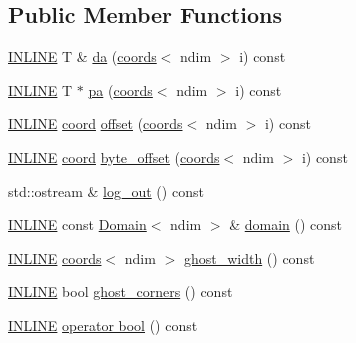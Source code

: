 \subsection*{Public Member Functions}
\begin{DoxyCompactItemize}
\item 
\hyperlink{common_8hpp_a2eb6f9e0395b47b8d5e3eeae4fe0c116}{I\+N\+L\+I\+NE} T \& \hyperlink{classshark_1_1ndim_1_1_global_array_aeadb9a62b97953c4b7a7a047632d117a}{da} (\hyperlink{structshark_1_1ndim_1_1coords}{coords}$<$ ndim $>$ i) const
\item 
\hyperlink{common_8hpp_a2eb6f9e0395b47b8d5e3eeae4fe0c116}{I\+N\+L\+I\+NE} T $\ast$ \hyperlink{classshark_1_1ndim_1_1_global_array_a31a8a5247cc8adbe0602a83de759d915}{pa} (\hyperlink{structshark_1_1ndim_1_1coords}{coords}$<$ ndim $>$ i) const
\item 
\hyperlink{common_8hpp_a2eb6f9e0395b47b8d5e3eeae4fe0c116}{I\+N\+L\+I\+NE} \hyperlink{namespaceshark_a767a92d5dd82cb82266473bff42fa6d9}{coord} \hyperlink{classshark_1_1ndim_1_1_global_array_a63c8f10949e3f8d7ffdf532440190ca1}{offset} (\hyperlink{structshark_1_1ndim_1_1coords}{coords}$<$ ndim $>$ i) const
\item 
\hyperlink{common_8hpp_a2eb6f9e0395b47b8d5e3eeae4fe0c116}{I\+N\+L\+I\+NE} \hyperlink{namespaceshark_a767a92d5dd82cb82266473bff42fa6d9}{coord} \hyperlink{classshark_1_1ndim_1_1_global_array_afc41f124baff4e53c97c38c8cbd82398}{byte\+\_\+offset} (\hyperlink{structshark_1_1ndim_1_1coords}{coords}$<$ ndim $>$ i) const
\item 
std\+::ostream \& \hyperlink{classshark_1_1ndim_1_1_global_array_ae56b93f4ac19003102749015275a6d0c}{log\+\_\+out} () const
\item 
\hyperlink{common_8hpp_a2eb6f9e0395b47b8d5e3eeae4fe0c116}{I\+N\+L\+I\+NE} const \hyperlink{classshark_1_1ndim_1_1_domain}{Domain}$<$ ndim $>$ \& \hyperlink{classshark_1_1ndim_1_1_global_array_a435ee8ff23c3feadf2ef2be64d4f375c}{domain} () const
\item 
\hyperlink{common_8hpp_a2eb6f9e0395b47b8d5e3eeae4fe0c116}{I\+N\+L\+I\+NE} \hyperlink{structshark_1_1ndim_1_1coords}{coords}$<$ ndim $>$ \hyperlink{classshark_1_1ndim_1_1_global_array_a5331f21887f3c14791b758e99656a676}{ghost\+\_\+width} () const
\item 
\hyperlink{common_8hpp_a2eb6f9e0395b47b8d5e3eeae4fe0c116}{I\+N\+L\+I\+NE} bool \hyperlink{classshark_1_1ndim_1_1_global_array_abf0c9312657087578f89e1279ee6c451}{ghost\+\_\+corners} () const
\item 
\hyperlink{common_8hpp_a2eb6f9e0395b47b8d5e3eeae4fe0c116}{I\+N\+L\+I\+NE} \hyperlink{classshark_1_1ndim_1_1_global_array_aca73ba70ecbbc7f3224fd48582a15447}{operator bool} () const

\end{DoxyCompactItemize}

